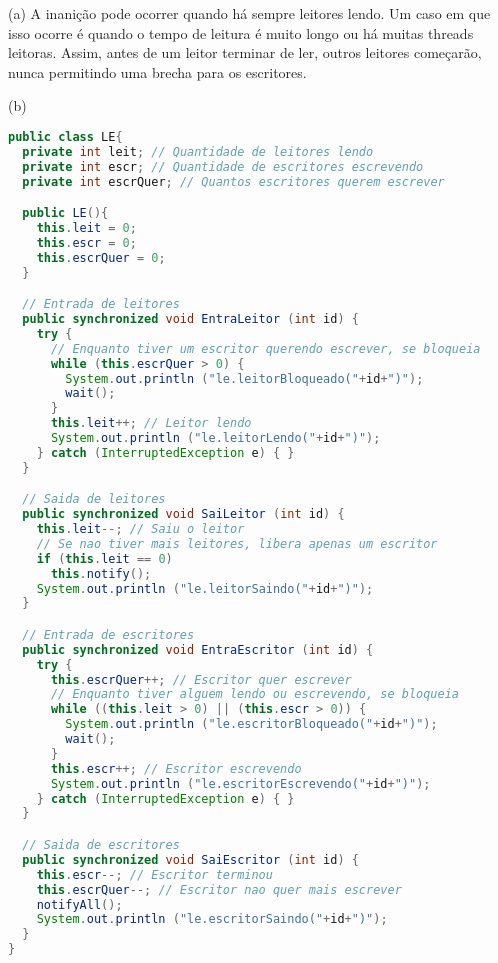 \documentclass{homework}
\begin{document}
\exercise*
(a) A inanição pode ocorrer quando há sempre leitores lendo. Um caso em que isso ocorre é quando o tempo de leitura é muito longo ou há muitas threads leitoras. Assim, antes de um leitor terminar de ler, outros leitores começarão, nunca permitindo uma brecha para os escritores.

(b)
\begin{lstlisting}[language=Java]
public class LE{
  private int leit; // Quantidade de leitores lendo
  private int escr; // Quantidade de escritores escrevendo
  private int escrQuer; // Quantos escritores querem escrever

  public LE(){
    this.leit = 0;
    this.escr = 0;
    this.escrQuer = 0;
  }

  // Entrada de leitores
  public synchronized void EntraLeitor (int id) {
    try {
      // Enquanto tiver um escritor querendo escrever, se bloqueia
      while (this.escrQuer > 0) {
        System.out.println ("le.leitorBloqueado("+id+")");
        wait();
      }
      this.leit++; // Leitor lendo
      System.out.println ("le.leitorLendo("+id+")");
    } catch (InterruptedException e) { }
  }

  // Saida de leitores
  public synchronized void SaiLeitor (int id) {
    this.leit--; // Saiu o leitor
    // Se nao tiver mais leitores, libera apenas um escritor
    if (this.leit == 0)
      this.notify();
    System.out.println ("le.leitorSaindo("+id+")");
  }

  // Entrada de escritores
  public synchronized void EntraEscritor (int id) {
    try {
      this.escrQuer++; // Escritor quer escrever
      // Enquanto tiver alguem lendo ou escrevendo, se bloqueia
      while ((this.leit > 0) || (this.escr > 0)) {
        System.out.println ("le.escritorBloqueado("+id+")");
        wait(); 
      }
      this.escr++; // Escritor escrevendo
      System.out.println ("le.escritorEscrevendo("+id+")");
    } catch (InterruptedException e) { }
  }

  // Saida de escritores
  public synchronized void SaiEscritor (int id) {
    this.escr--; // Escritor terminou
    this.escrQuer--; // Escritor nao quer mais escrever
    notifyAll();
    System.out.println ("le.escritorSaindo("+id+")");
  }
}

\end{lstlisting}
\end{document}
